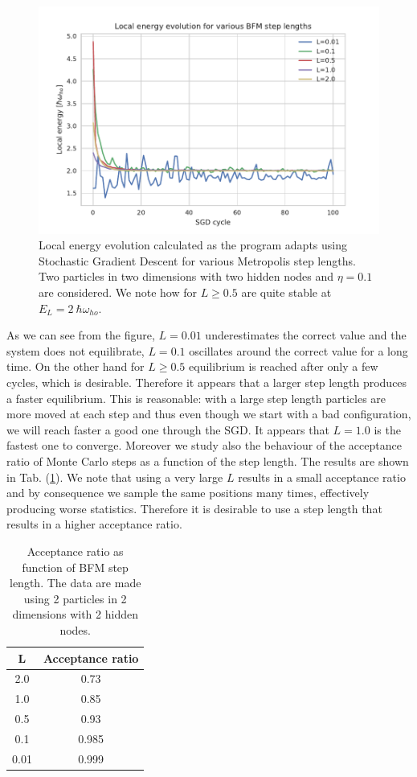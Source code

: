 \begin{figure}[H]
\centering
\includegraphics[scale=1.0]{plot1.pdf}
\caption{Local energy evolution calculated as the program adapts using Stochastic Gradient Descent for various Metropolis step lengths. Two particles in two dimensions with two hidden nodes and $\eta = 0.1$ are considered. We note how for $L\geq 0.5$ are quite stable at $E_L=2\ \hbar\omega_{ho}$.}
\label{Fig:1}
\end{figure}

As we can see from the figure, $L=0.01$ underestimates the correct value and the system does not equilibrate, $L=0.1$ oscillates around the correct value for a long time. On the other hand for $L\geq0.5$ equilibrium is reached after only a few cycles, which is desirable. Therefore it appears that a larger step length produces a faster equilibrium. This is reasonable: with a large step length particles are more moved at each step and thus even though we start with a bad configuration, we will reach faster a good one through the SGD. It appears that $L=1.0$ is the fastest one to converge. 
Moreover we study also the behaviour of the acceptance ratio of Monte Carlo steps as a function of the step length. The results are shown in Tab. (\ref{Tab:1}). We note that using a very large $L$ results in a small acceptance ratio and by consequence we sample the same positions many times, effectively producing worse statistics. Therefore it is desirable to use a step length that results in a higher acceptance ratio. 

\begin{table}[H]
\caption{Acceptance ratio as function of BFM step length. The data are made using  2 particles in 2 dimensions with 2 hidden nodes.}
\centering
\begin{tabular}{c| c } 
\textbf{L} & \textbf{Acceptance ratio} \\ \hline
2.0  & 0.73   \\
1.0 & 0.85  \\
0.5  &  0.93 \\
0.1  &  0.985 \\
0.01  &  0.999 \\ 
\end{tabular}
\label{Tab:1}
\end{table} 

